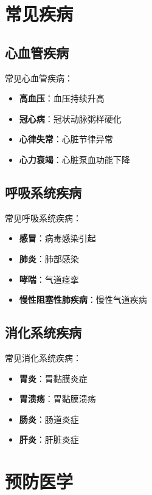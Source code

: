\documentclass[12pt,UTF8]{ctexbook}
\begin{document}
\chapter{常见疾病}
\label{chap:common_diseases}

\section{心血管疾病}
\label{sec:cardiovascular_diseases}

常见心血管疾病：
\begin{itemize}
    \item \textbf{高血压}：血压持续升高
    \item \textbf{冠心病}：冠状动脉粥样硬化
    \item \textbf{心律失常}：心脏节律异常
    \item \textbf{心力衰竭}：心脏泵血功能下降
\end{itemize}

\section{呼吸系统疾病}
\label{sec:respiratory_diseases}

常见呼吸系统疾病：
\begin{itemize}
    \item \textbf{感冒}：病毒感染引起
    \item \textbf{肺炎}：肺部感染
    \item \textbf{哮喘}：气道痉挛
    \item \textbf{慢性阻塞性肺疾病}：慢性气道疾病
\end{itemize}

\section{消化系统疾病}
\label{sec:digestive_diseases}

常见消化系统疾病：
\begin{itemize}
    \item \textbf{胃炎}：胃黏膜炎症
    \item \textbf{胃溃疡}：胃黏膜溃疡
    \item \textbf{肠炎}：肠道炎症
    \item \textbf{肝炎}：肝脏炎症
\end{itemize}

\chapter{预防医学}
\label{chap:preventive_medicine}
\end{document}
